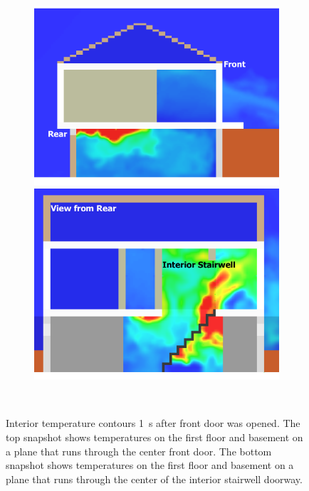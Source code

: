 \documentclass[12pt,oneside]{book}
\begin{document}
\begin{figure}[!ht]
\begin{subfigure}{0.65\textwidth}
\includegraphics[trim = 0in 0in 0in 0in, clip=true, width=\textwidth]{../Figures/side_view_101s} \\
\includegraphics[trim = 0in 0in 0in 0in, clip=true, width=\textwidth]{../Figures/stair_view_101s} 
\end{subfigure}
\begin{subfigure}{0.35\textwidth}

 \\
\end{subfigure}
\caption[Interior temperature contours 1~s after front door was opened]
{Interior temperature contours 1~s after front door was opened. The top snapshot shows temperatures on the first floor and basement on a plane that runs through the center front door. The bottom snapshot shows temperatures on the first floor and basement on a plane that runs through the center of the interior stairwell doorway.}
\label{fig:int_temp_101s}
\end{figure}
\end{document}
